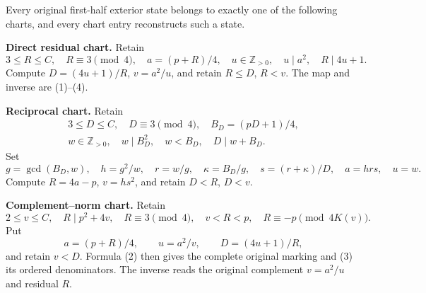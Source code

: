 \begin{theorem}\label{thm:atlas}
Every original first-half exterior state belongs to exactly one of the following
charts, and every chart entry reconstructs such a state.

\textbf{Direct residual chart.} Retain
\[
 3\le R\le C,\quad R\equiv3\pmod4,\quad a=(p+R)/4,
 \quad u\in\mathbb Z_{>0},\quad u\mid a^2,\quad R\mid4u+1.
\]
Compute $D=(4u+1)/R$, $v=a^2/u$, and retain $R\le D$, $R<v$.
The map and inverse are (1)--(4).

\textbf{Reciprocal chart.} Retain
\[
 \begin{gathered}
 3\le D\le C,\quad D\equiv3\pmod4,\quad B_D=(pD+1)/4,\\
 w\in\mathbb Z_{>0},\quad w\mid B_D^2,\quad
 w<B_D,\quad D\mid w+B_D.
 \end{gathered}
\]
Set
\[
 g=\gcd(B_D,w),\quad
 h=g^2/w,\quad r=w/g,\quad\kappa=B_D/g,
 \quad s=(r+\kappa)/D,\quad a=hrs,\quad u=w.
\]
Compute $R=4a-p$, $v=hs^2$, and retain $D<R$, $D<v$.

\textbf{Complement--norm chart.} Retain
\[
 \boxed{2\le v\le C,\quad R\mid p^2+4v,\quad
 R\equiv3\pmod4,\quad v<R<p,\quad
 R\equiv-p\pmod{4K(v)}.}                               \tag{12}
\]
Put
\[
 \boxed{a=(p+R)/4,\qquad u=a^2/v,\qquad
 D=(4u+1)/R,}                                           \tag{13}
\]
and retain $v<D$. Formula (2) then gives the complete original marking and (3)
its ordered denominators. The inverse reads the original complement $v=a^2/u$
and residual $R$.
\end{theorem}
